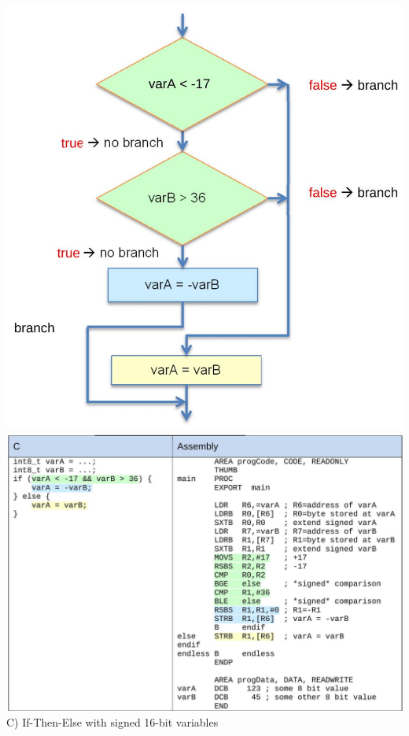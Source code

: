 \documentclass[10pt]{article}
\begin{document}
\includegraphics[width=\linewidth]{images/2025_01_02_7eee2d56b23c0199f878g-6}\\
\includegraphics[width=\linewidth]{images/2025_01_02_7eee2d56b23c0199f878g-6(1)}\\
C) If-Then-Else with signed 16-bit variables\\
\end{document}
